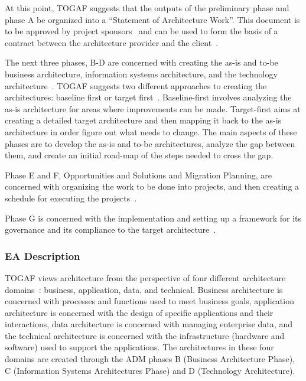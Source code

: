 At this point, TOGAF suggests that the outputs of the preliminary phase and phase A be organized into a ``Statement of Architecture Work''. This document is to be approved by project sponsors~\cite[Sec. 7.4.11]{togaf9.1} and can be used to form the basis of a contract between the architecture provider and the client~\cite[Sec. 36.2.20]{togaf9.1}.

The next three phases, B-D are concerned with creating the as-is and to-be business architecture, information systems architecture, and the technology architecture~\cite[Ch.8-12]{togaf9.1}. TOGAF suggests two different approaches to creating the architectures: baseline first or target first~\cite[Ch. 19.4]{togaf9.1}. Baseline-first involves analyzing the as-is architecture for areas where improvements can be made. Target-first aims at creating a detailed target architecture and then mapping it back to the as-is architecture in order figure out what needs to change. The main aspects of these phases are to develop the as-is and to-be architectures, analyze the gap between them, and create an initial road-map of the steps needed to cross the gap.

Phase E and F, Opportunities and Solutions and Migration Planning, are concerned with organizing the work to be done into projects, and then creating a schedule for executing the projects~\cite[Ch. 13-14]{togaf9.1}.

Phase G is concerned with the implementation and setting up a framework for its governance and its compliance to the target architecture~\cite[Ch. 15]{togaf9.1}.


\subsubsection{EA Description}
TOGAF views architecture from the perspective of four different architecture domains~\cite{sessions2007}: business, application, data, and technical. Business architecture is concerned with processes and functions used to meet business goals, application architecture is concerned with the design of specific applications and their interactions, data architecture is concerned with managing enterprise data, and the technical architecture is concerned with the infrastructure (hardware and software) used to support the applications. The architectures in these four domains are created through the ADM phases B (Business Architecture Phase), C (Information Systems Architectures Phase) and D (Technology Architecture).

